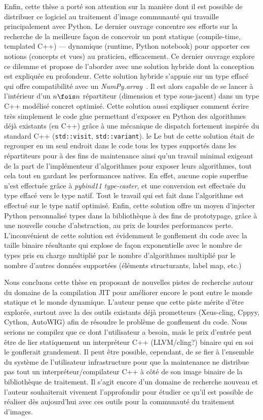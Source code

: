 Enfin, cette thèse a porté son attention sur la manière dont il est possible de distribuer ce logiciel au traitement
d'image communauté qui travaille principalement avec Python. Le dernier ouvrage concentre ses efforts sur la recherche
de la meilleure façon de concevoir un pont statique (compile-time, templated C++) --- dynamique (runtime, Python
notebook) pour apporter ces notions (concepts et vues) au praticien, efficacement. Ce dernier ouvrage explore ce dilemme
et propose de l'aborder avec une solution hybride dont la conception est expliquée en profondeur. Cette solution hybride
s'appuie sur un type effacé qui offre compatibilité avec un \emph{NumPy.array}~\parencite{harris.2020.numpy}. Il est
alors capable de se lancer à l'intérieur d'un \(n \fois n\) répartiteur (dimension et type sous-jacent) dans un type C++
modélisé concret optimisé. Cette solution aussi expliquer comment écrire très simplement le code glue permettant
d'exposer en Python des algorithmes déjà existants (en C++) grâce à une mécanique de dispatch fortement inspirée du
standard C++ (\texttt{std::visit}, \texttt{std::variant}). le Le but de cette solution était de regrouper en un seul
endroit dans le code tous les types supportés dans les répartiteurs pour à des fins de maintenance ainsi qu'un travail
minimal exigeant de la part de l'implémenteur d'algorithmes pour exposer leurs algorithmes, tout cela tout en gardant
les performances natives. En effet, aucune copie superflue n'est effectuée grâce à \emph{pybind11} \emph{type-caster},
et une conversion est effectuée du type effacé vers le type natif. Tout le travail qui est fait dans l'algorithme est
effectué sur le type natif optimisé. Enfin, cette solution offre un moyen d'injecter Python personnalisé types dans la
bibliothèque à des fins de prototypage, grâce à une nouvelle couche d'abstraction, au prix de lourdes performances
perte. L'inconvénient de cette solution est évidemment le gonflement du code avec la taille binaire résultante qui
explose de façon exponentielle avec le nombre de types pris en charge multiplié par le nombre d'algorithmes multiplié
par le nombre d'autres données supportées (éléments structurants, label map, etc.)

Nous concluons cette thèse en proposant de nouvelles pistes de recherche autour du domaine de la compilation JIT pour
améliorer encore le pont entre le monde statique et le monde dynamique. L'auteur pense que cette piste mérite d'être
explorée, surtout avec la des outils existants déjà prometteurs (Xeus-cling, Cppyy, Cython, AutoWIG) afin de résoudre le
problème de gonflement du code. Nous serions ne compilez que ce dont l'utilisateur a besoin, mais le prix d'entrée peut
être de lier statiquement un interpréteur C++ (LLVM/cling?) binaire qui en soi le gonflerait grandement. Il peut être
possible, cependant, de se fier à l'ensemble du système de l'utilisateur infrastructure pour que la maintenance ne
distribue pas tout un interpréteur/compilateur C++ à côté de son image binaire de la bibliothèque de traitement. Il
s'agit encore d'un domaine de recherche nouveau et l'auteur souhaiterait vivement l'approfondir pour étudier ce qu'il
est possible de réaliser dès aujourd'hui avec ces outils pour la communauté du traitement d'images.
